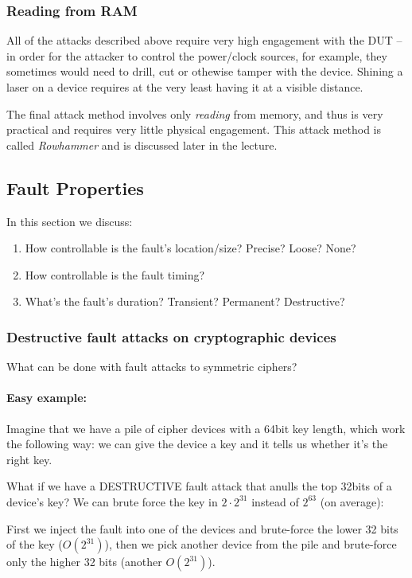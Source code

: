 \subsubsection{Reading from RAM}
All of the attacks described above require very high engagement with the DUT -- in order for the attacker to control the power/clock sources, for example, they sometimes would need to drill, cut or othewise tamper with the device. Shining a laser on a device requires at the very least having it at a visible distance.

The final attack method involves only \emph{reading} from memory, and thus is very practical and requires very little physical engagement. This attack method is called \emph{Rowhammer} and is discussed later in the lecture.


\subsection{Fault Properties}
In this section we discuss:
\begin{enumerate}
    \item How controllable is the fault's location/size? Precise? Loose? None?
    \item How controllable is the fault timing?
    \item What's the fault's duration? Transient? Permanent? Destructive?
\end{enumerate}


\subsubsection*{Destructive fault attacks on cryptographic devices}
What can be done with fault attacks to symmetric ciphers?
\paragraph{Easy example:} Imagine that we have a pile of cipher devices with a 64bit key length, which work the following way: we can give the device a key and it tells us whether it's the right key.

What if we have a DESTRUCTIVE fault attack that anulls the top 32bits of a device's key? We can brute force the key in $2\cdot2^{31}$ instead of $2^{63}$ (on average):

First we inject the fault into one of the devices and brute-force the lower 32 bits of the key ($O(2^{31})$), then we pick another device from the pile and brute-force only the higher 32 bits (another $O(2^{31})$).


